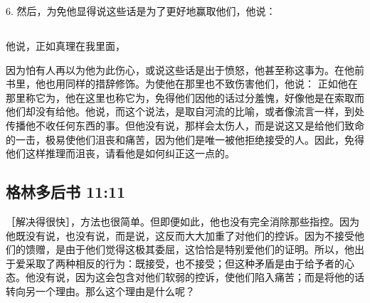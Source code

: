 6. 然后，为免他显得说这些话是为了更好地赢取他们，他说：\par


\subsection{}

他说，正如真理在我里面，\par

因为怕有人再以为他为此伤心，或说这些话是出于愤怒，他甚至称这事为。在他前书里，他也用同样的措辞修饰。为使他在那里也不致伤害他们，他说： 正如他在那里称它为，他在这里也称它为，免得他们因他的话过分羞愧，好像他是在索取而他们却没有给他。他说，而这个说法，是取自河流的比喻，或者像流言一样，到处传播他不收任何东西的事。但他没有说，那样会太伤人，而是说这又是给他们致命的一击，极易使他们沮丧和痛苦，因为他们是唯一被他拒绝接受的人。因此，免得他们这样推理而沮丧，请看他是如何纠正这一点的。\par


\subsection{格林多后书 11:11}

\par

［解决得很快］，方法也很简单。但即便如此，他也没有完全消除那些指控。因为他既没有说，也没有说，而是说，这反而大大加重了对他们的控诉。因为不接受他们的馈赠，是由于他们觉得这极其委屈，这恰恰是特别爱他们的证明。所以，他出于爱采取了两种相反的行为：既接受，也不接受；但这种矛盾是由于给予者的心态。他没有说，因为这会包含对他们软弱的控诉，使他们陷入痛苦；而是将他的话转向另一个理由。那么这个理由是什么呢？\par

